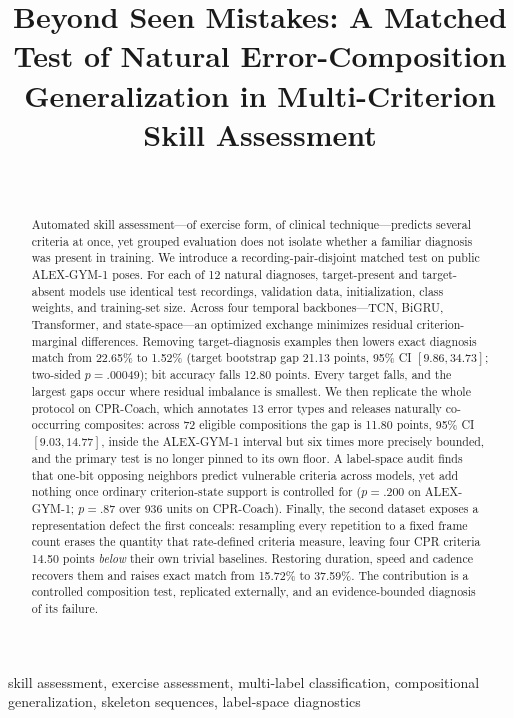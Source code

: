 \documentclass[conference,a4paper]{IEEEtran}
\title{Beyond Seen Mistakes: A Matched Test of Natural Error-Composition\\Generalization in Multi-Criterion Skill Assessment}
\author{\IEEEauthorblockN{Anonymous Author(s)}\\\IEEEauthorblockA{Under double-blind review}}
\begin{document}
\maketitle

\begin{abstract}
Automated skill assessment---of exercise form, of clinical technique---predicts
several criteria at once, yet grouped evaluation does not isolate whether a
familiar diagnosis was present in training. We introduce a recording-pair-disjoint matched test on public
ALEX-GYM-1 poses. For each of 12 natural diagnoses, target-present and
target-absent models use identical test recordings, validation data,
initialization, class weights, and training-set size. Across four temporal
backbones---TCN, BiGRU, Transformer, and state-space---an optimized exchange
minimizes residual criterion-marginal differences. Removing target-diagnosis
examples then lowers exact diagnosis match from 22.65\% to 1.52\% (target
bootstrap gap 21.13 points, 95\% CI $[9.86,34.73]$; two-sided $p=.00049$); bit
accuracy falls 12.80 points. Every target falls, and the largest gaps occur
where residual imbalance is smallest. We then replicate the whole protocol on
CPR-Coach, which annotates 13 error types and releases naturally co-occurring
composites: across 72 eligible compositions the gap is 11.80 points, 95\% CI
$[9.03,14.77]$, inside the ALEX-GYM-1 interval but six times more precisely
bounded, and the primary test is no longer pinned to its own floor. A label-space
audit finds that one-bit opposing neighbors predict vulnerable criteria across
models, yet add nothing once ordinary criterion-state support is controlled for
($p=.200$ on ALEX-GYM-1; $p=.87$ over 936 units on CPR-Coach). Finally, the
second dataset exposes a representation defect the first conceals: resampling
every repetition to a fixed frame count erases the quantity that rate-defined
criteria measure, leaving four CPR criteria 14.50 points \emph{below} their own
trivial baselines. Restoring duration, speed and cadence recovers them and
raises exact match from 15.72\% to 37.59\%. The contribution is a controlled
composition test, replicated externally, and an evidence-bounded diagnosis of
its failure.
\end{abstract}

\begin{IEEEkeywords}
skill assessment, exercise assessment, multi-label classification,
compositional generalization, skeleton sequences, label-space diagnostics
\end{IEEEkeywords}
\end{document}
